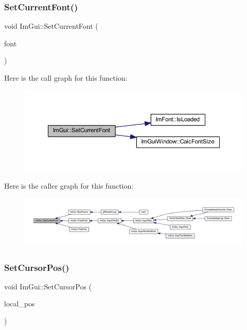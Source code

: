 \subsubsection{\texorpdfstring{Set\+Current\+Font()}{SetCurrentFont()}}
{\footnotesize\ttfamily void Im\+Gui\+::\+Set\+Current\+Font (\begin{DoxyParamCaption}\item[{\mbox{\hyperlink{struct_im_font}{Im\+Font}} $\ast$}]{font }\end{DoxyParamCaption})}

Here is the call graph for this function\+:
\nopagebreak
\begin{figure}[H]
\begin{center}
\leavevmode
\includegraphics[width=350pt]{namespace_im_gui_a4f83c0a884e07247a00700d3dd3d01e3_cgraph}
\end{center}
\end{figure}
Here is the caller graph for this function\+:
\nopagebreak
\begin{figure}[H]
\begin{center}
\leavevmode
\includegraphics[width=350pt]{namespace_im_gui_a4f83c0a884e07247a00700d3dd3d01e3_icgraph}
\end{center}
\end{figure}
\mbox{\label{namespace_im_gui_a51ea13c986360d8a2e868dc9eeac2115}} 
\subsubsection{\texorpdfstring{Set\+Cursor\+Pos()}{SetCursorPos()}}
{\footnotesize\ttfamily void Im\+Gui\+::\+Set\+Cursor\+Pos (\begin{DoxyParamCaption}\item[{const \mbox{\hyperlink{struct_im_vec2}{Im\+Vec2}} \&}]{local\+\_\+pos }\end{DoxyParamCaption})}

